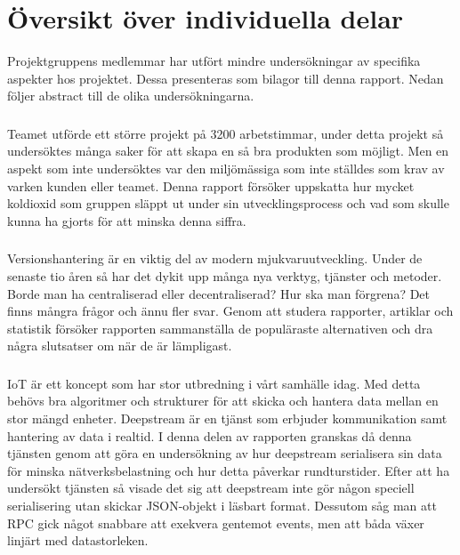 \chapter{Översikt över individuella delar}
Projektgruppens medlemmar har utfört mindre undersökningar av specifika aspekter hos projektet. Dessa presenteras som bilagor till denna rapport. Nedan följer abstract till de olika undersökningarna.

\subsection*{}
Teamet utförde ett större projekt på 3200 arbetstimmar, under detta projekt så undersöktes många saker för att skapa en så bra produkten som möjligt. Men en aspekt som inte undersöktes var den miljömässiga som inte ställdes som krav av varken kunden eller teamet. Denna rapport försöker uppskatta hur mycket koldioxid som gruppen släppt ut under sin utvecklingsprocess och vad som skulle kunna ha gjorts för att minska denna siffra.

\subsection*{}
Versionshantering är en viktig del av modern mjukvaruutveckling. Under de senaste tio åren så har det dykit upp många nya verktyg, tjänster och metoder. Borde man ha centraliserad eller decentraliserad? Hur ska man förgrena? Det finns mångra frågor och ännu fler svar. Genom att studera rapporter, artiklar och statistik försöker rapporten sammanställa de populäraste alternativen och dra några slutsatser om när de är lämpligast.

\subsection*{}
IoT är ett koncept som har stor utbredning i vårt samhälle idag. Med detta behövs bra algoritmer och strukturer för att skicka och hantera data mellan en stor mängd enheter. Deepstream är en tjänst som erbjuder kommunikation samt hantering av data i realtid. I denna delen av rapporten granskas då denna tjänsten genom att göra en undersökning av hur deepstream serialisera sin data för minska nätverksbelastning och hur detta påverkar rundturstider. Efter att ha undersökt tjänsten så visade det sig att deepstream inte gör någon speciell serialisering utan skickar JSON-objekt i läsbart format. Dessutom såg man att RPC gick något snabbare att exekvera gentemot events, men att båda växer linjärt med datastorleken.

